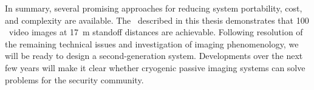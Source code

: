 In summary, several promising approaches for reducing system portability, cost, and complexity are available.
The \Imager\ described in this thesis demonstrates that \SI{100}{\mK} \NETD\ video images at \SI{17}{\m} standoff distances are achievable.
Following resolution of the remaining technical issues and investigation of imaging phenomenology, we will be ready to design a second-generation system.
Developments over the next few years will make it clear whether cryogenic passive imaging systems can solve problems for the security community.


